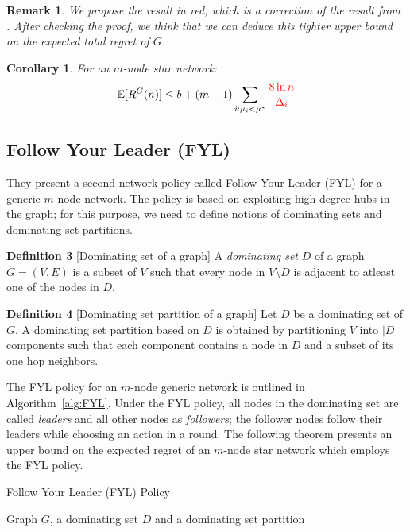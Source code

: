 \documentclass{article}
\newtheorem{corollary}{Corollary}
\newtheorem{remark}{Remark}
\begin{document}
\begin{remark}
  We propose the result in red, which is a correction of the result from \cite{DBLP:journals/corr/KollaJG16}. After checking the proof, we think that we can deduce this tighter upper bound on the expected total regret of $G$.
\end{remark}

\begin{corollary}
  For an $m$-node star network:
  \begin{equation}
    \mathbb{E}[R^G(n)] \leq b + (m - 1) \sum\limits_{i:\mu_i < \mu^*} {\color{red} \frac{8 \ln n}{\Delta_i}}
  \end{equation}
\end{corollary}

\subsection{Follow Your Leader (FYL)}
They present a second network policy called Follow Your Leader (FYL) for a generic $m$-node network. The policy is based on exploiting high-degree hubs in the graph; for this purpose, we need to define notions of dominating sets and dominating set partitions.

\textbf{Definition 3} [Dominating set of a graph] A \textit{dominating set} $D$ of a graph $G = (V,E)$ is a subset of $V$ such that every node in $V\setminus D$ is adjacent to atleast one of the nodes in $D$.

\textbf{Definition 4} [Dominating set partition of a graph]
Let $D$ be a dominating set of $G$. A dominating set partition based on $D$ is obtained by partitioning $V$ into $|D|$ components such that each component contains a node in $D$ and a subset of its one hop neighbors.

The FYL policy for an $m$-node generic network is outlined in Algorithm~\ref{alg:FYL}. Under the FYL policy, all nodes in the dominating set are called {\em leaders} and all other nodes as {\em followers}; the follower nodes follow their leaders while choosing an action in a round.
The following theorem presents an upper bound on the expected regret of an $m$-node star network which employs the FYL policy.

\begin{algorithm}[htb]
   \caption{Follow Your Leader (FYL) Policy}
   \label{alg:FYL}
   \begin{algorithmic}
      Graph $G$, a dominating set $D$ and a dominating set partition
  \end{algorithmic}
\end{algorithm}
\end{document}
